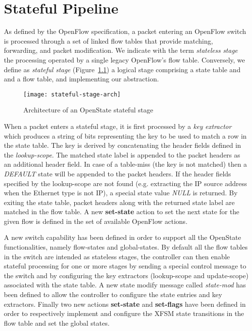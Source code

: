 
\chapter{Stateful Pipeline}


As defined by the OpenFlow specification, a packet entering an OpenFlow switch is processed through a set of linked flow tables that provide matching, forwarding, and packet modification. We indicate with the term \emph{stateless stage} the processing operated by a single legacy OpenFlow's flow table. Conversely, we define as \emph{stateful stage} (Figure~\ref{f:stateful-stage}) a logical stage comprising a state table and and a flow table, and implementing our abstraction.

\begin{figure}[h]
	\centering
	\texttt{[image: stateful-stage-arch]}
	\caption{Architecture of an OpenState stateful stage}
	\label{f:stateful-stage}
\end{figure}

When a packet enters a stateful stage, it is first processed by a \emph{key extractor} which produces a string of bits representing the key to be used to match a row in the state table. The key is derived by concatenating the header fields defined in the \emph{lookup-scope}. The matched state label is appended to the packet headers as an additional header field. In case of a table-miss (the key is not matched) then a \emph{DEFAULT} state will be appended to the packet headers. If the header fields specified by the lookup-scope are not found (e.g. extracting the IP source address when the Ethernet type is not IP), a special state value \emph{NULL} is returned. By exiting the state table, packet headers along with the returned state label are matched in the flow table. A new \textbf{set-state} action to set the next state for the given flow is defined in the set of available OpenFlow actions.


A new switch capability has been defined in order to support all the OpenState functionalities, namely flow-states and global-states. By default all the flow tables in the switch are intended as stateless stages, the controller can then enable stateful processing for one or more stages by sending a special control message to the switch and by configuring the key extractors (lookup-scope and update-scope) associated with the state table. A new state modify message called \emph{state-mod} has been defined to allow the controller to configure the state entries and key extractors. Finally two new actions \textbf{set-state} and \textbf{set-flags} have been defined in order to respectively implement and configure the XFSM state transitions in the flow table and set the global states.